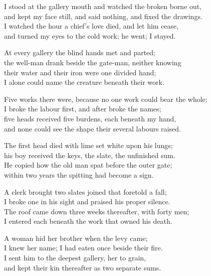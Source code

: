 \begin{founder}
I stood at the gallery mouth and watched the broken borne out,\\
and kept my face still, and said nothing, and fixed the drawings.\\
I watched the hour a chief's love died, and let him cease,\\
and turned my eyes to the cold work; he went; I stayed.\\
\medskip

At every gallery the blind hands met and parted;\\
the well-man drank beside the gate-man, neither knowing\\
their water and their iron were one divided hand;\\
I alone could name the creature beneath their work.\\
\medskip

Five works there were, because no one work could bear the whole;\\
I broke the labour first, and after broke the names;\\
five heads received five burdens, each beneath my hand,\\
and none could see the shape their several labours raised.\\
\medskip

The first head died with lime set white upon his lungs;\\
his boy received the keys, the slate, the unfinished sum.\\
He copied how the old man spat before the outer gate;\\
within two years the spitting had become a sign.\\
\medskip

A clerk brought two slates joined that foretold a fall;\\
I broke one in his sight and praised his proper silence.\\
The roof came down three weeks thereafter, with forty men;\\
I entered each beneath the work that owned his death.\\
\medskip

A woman hid her brother when the levy came;\\
I knew her name; I had eaten once beside their fire.\\
I sent him to the deepest gallery, her to grain,\\
and kept their kin thereafter as two separate sums.\\
\medskip


\end{founder}
